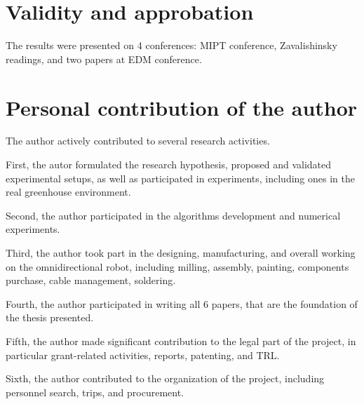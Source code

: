 
\section{Validity and approbation}
The results were presented on 4 conferences: MIPT conference, Zavalishinsky readings, and two papers at EDM conference.

\section{Personal contribution of the author}

The author actively contributed to several research activities.

First, the autor formulated the research hypothesis, proposed and validated experimental setups, as well as participated in experiments, including ones in the real greenhouse environment.

Second, the author participated in the algorithms development and numerical experiments.

Third, the author took part in the designing, manufacturing, and overall working on the omnidirectional robot, including milling, assembly, painting, components purchase, cable management, soldering.

Fourth, the author participated in writing all 6 papers, that are the foundation of the thesis presented.

Fifth, the author made significant contribution to the legal part of the project, in particular grant-related activities, reports, patenting, and TRL.

Sixth, the author contributed to the organization of the project, including personnel search, trips, and procurement.


%



